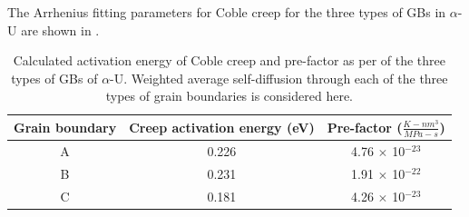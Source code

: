 \documentclass[review]{elsarticle}
\begin{document}
The Arrhenius fitting parameters for Coble creep for the three types of GBs in $\alpha$-U are shown in .
\begin{table}[h!]
\centering
\caption{Calculated activation energy of Coble creep and pre-factor as per  of the three types of GBs of $\alpha$-U. Weighted average self-diffusion through each of the three types of grain boundaries is considered here. \label{tab:creep}}
\begin{tabular}{|c|c|c|}
\hline
\multicolumn{1}{|c}{Grain boundary}
& \multicolumn{1}{|c}{Creep activation energy (eV) } & \multicolumn{1}{c|}{ Pre-factor ($\frac{K-nm^{3}}{MPa-s} $) } \\

\hline

A & 0.226 & 4.76 $\times$ 10$^{-23}$ \\
B & 0.231 & 1.91 $\times$ 10$^{-22}$ \\
C & 0.181 & 4.26 $\times$ 10$^{-23}$ \\

\hline
\end{tabular}
\end{table}


\setlength{\arrayrulewidth}{.5mm}
\setlength{\tabcolsep}{12pt}
\renewcommand{\arraystretch}{1.0}



\newpage


\end{document}

